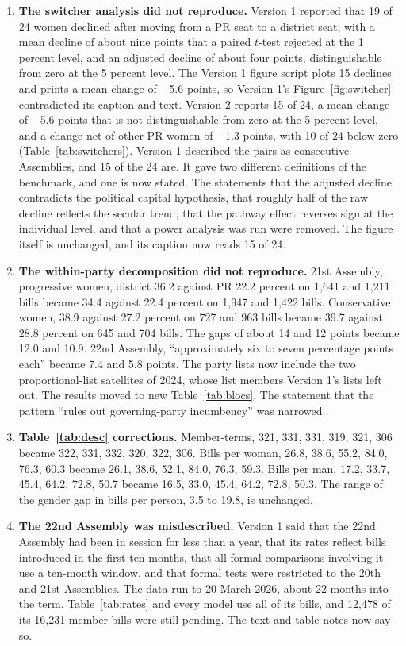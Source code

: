 \documentclass[11pt]{article}
\begin{document}
{\begin{enumerate}
\item \textbf{The switcher analysis did not reproduce.} Version 1 reported that 19 of 24 women declined after moving from a PR seat to a district seat, with a mean decline of about nine points that a paired $t$-test rejected at the 1 percent level, and an adjusted decline of about four points, distinguishable from zero at the 5 percent level. The Version 1 figure script plots 15 declines and prints a mean change of $-$5.6 points, so Version 1's Figure~\ref{fig:switcher} contradicted its caption and text. Version 2 reports 15 of 24, a mean change of $-$5.6 points that is not distinguishable from zero at the 5 percent level, and a change net of other PR women of $-$1.3 points, with 10 of 24 below zero (Table~\ref{tab:switchers}). Version 1 described the pairs as consecutive Assemblies, and 15 of the 24 are. It gave two different definitions of the benchmark, and one is now stated. The statements that the adjusted decline contradicts the political capital hypothesis, that roughly half of the raw decline reflects the secular trend, that the pathway effect reverses sign at the individual level, and that a power analysis was run were removed. The figure itself is unchanged, and its caption now reads 15 of 24.
\item \textbf{The within-party decomposition did not reproduce.} 21st Assembly, progressive women, district 36.2 against PR 22.2 percent on 1,641 and 1,211 bills became 34.4 against 22.4 percent on 1,947 and 1,422 bills. Conservative women, 38.9 against 27.2 percent on 727 and 963 bills became 39.7 against 28.8 percent on 645 and 704 bills. The gaps of about 14 and 12 points became 12.0 and 10.9. 22nd Assembly, ``approximately six to seven percentage points each'' became 7.4 and 5.8 points. The party lists now include the two proportional-list satellites of 2024, whose list members Version 1's lists left out. The results moved to new Table~\ref{tab:blocs}. The statement that the pattern ``rules out governing-party incumbency'' was narrowed.
\item \textbf{Table~\ref{tab:desc} corrections.} Member-terms, 321, 331, 331, 319, 321, 306 became 322, 331, 332, 320, 322, 306. Bills per woman, 26.8, 38.6, 55.2, 84.0, 76.3, 60.3 became 26.1, 38.6, 52.1, 84.0, 76.3, 59.3. Bills per man, 17.2, 33.7, 45.4, 64.2, 72.8, 50.7 became 16.5, 33.0, 45.4, 64.2, 72.8, 50.3. The range of the gender gap in bills per person, 3.5 to 19.8, is unchanged.
\item \textbf{The 22nd Assembly was misdescribed.} Version 1 said that the 22nd Assembly had been in session for less than a year, that its rates reflect bills introduced in the first ten months, that all formal comparisons involving it use a ten-month window, and that formal tests were restricted to the 20th and 21st Assemblies. The data run to 20 March 2026, about 22 months into the term. Table~\ref{tab:rates} and every model use all of its bills, and 12,478 of its 16,231 member bills were still pending. The text and table notes now say so.

\end{enumerate}}
\end{document}
